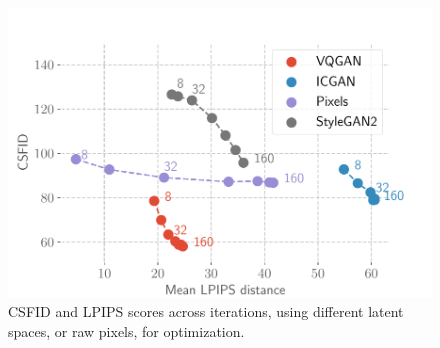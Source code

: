 \begin{figure}[H]
    \centering
    \vspace{-1cm}
    \includegraphics[width=.6\linewidth]{images/flexit/assets/encoder_evol.pdf}
    \caption{\ac{CSFID} and \ac{LPIPS} scores across iterations, using different latent spaces, or raw pixels, for optimization. 
    }
    \label{fig:encoders}
\end{figure}

